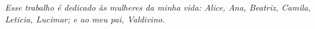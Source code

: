 \begin{dedicatoria}
   \vspace*{\fill}
   \centering
   \noindent
   \textit{Esse trabalho é dedicado às mulheres da minha vida: Alice, Ana, Beatriz, Camila, Leticia, Lucimar; e ao meu pai, Valdivino.} \vspace*{\fill}
\end{dedicatoria}

